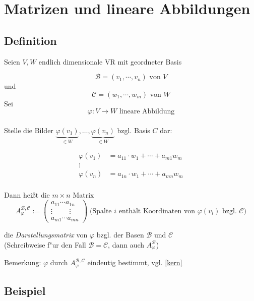  
 
 
\section{Matrizen und lineare Abbildungen}

\subsection{Definition}

Seien $V,W$ endlich dimensionale VR mit geordneter Basis

\[\mathcal{B} = (v_1,\cdots,v_n) \text{ von } V\] und
\[\mathcal{C} = (w_1,\cdots,w_m) \text{ von } W\] Sei
\[\varphi:V\rightarrow W \text{ lineare Abbildung}\]
\\
Stelle die Bilder $\underbrace{\varphi(v_1)}_{\in W}, \ldots, \underbrace{\varphi(v_n)}_{\in W}$ bzgl. Basis $C$ dar:

\begin{align*}
\varphi(v_1) &= a_{11} \cdot w_1 + \cdots + a_{m1}w_m\\
\vdots\\
\varphi(v_n) &= a_{1n} \cdot w_1 + \cdots + a_{mn}w_m\\
\end{align*}

Dann heißt die $m\times n$ Matrix
\[\left. A_\varphi^{\mathcal{B},\mathcal{C}} :=
\begin{pmatrix}
a_{11} \cdots a_{1n}\\
\vdots \hspace{1cm} \vdots\\
a_{m1}\cdots a_{mn}
\end{pmatrix}\right. \;\text{(Spalte $i$ enthält Koordinaten von $\varphi(v_i)$ bzgl. $\mathcal{C}$)}\]

die \emph{Darstellungsmatrix} von $\varphi$ bzgl. der Basen $\mathcal{B}$ und $\mathcal{C}$ \\(Schreibweise f"ur den Fall $\mathcal{B} =
\mathcal{C}$, dann auch  $A_\varphi^\mathcal{B}$)

Bemerkung: $\varphi$ durch $A_\varphi^{\mathcal{B},\mathcal{C}}$ eindeutig bestimmt, vgl. \ref{kern}

\subsection{Beispiel}

